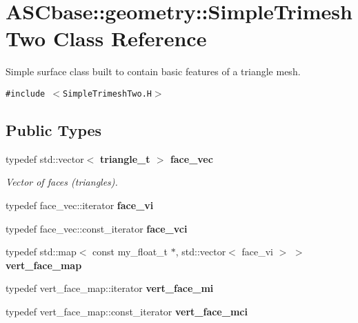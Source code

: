 \section{ASCbase::geometry::Simple\-Trimesh\-Two Class Reference}
\label{classASCbase_1_1geometry_1_1SimpleTrimeshTwo}
Simple surface class built to contain basic features of a triangle mesh.  


{\tt \#include $<$Simple\-Trimesh\-Two.H$>$}

\subsection*{Public Types}
\begin{CompactItemize}
\item 
typedef std::vector$<$ \bf{triangle\_\-t} $>$ \bf{face\_\-vec}\label{classASCbase_1_1geometry_1_1SimpleTrimeshTwo_ec05b95a341017a23bdde9bf620ebd9d}

\begin{CompactList}\small\item\em Vector of faces (triangles). \item\end{CompactList}\item 
typedef face\_\-vec::iterator \textbf{face\_\-vi}\label{classASCbase_1_1geometry_1_1SimpleTrimeshTwo_9f9179ecbefd0b14eb5b29e70bb525fd}

\item 
typedef face\_\-vec::const\_\-iterator \textbf{face\_\-vci}\label{classASCbase_1_1geometry_1_1SimpleTrimeshTwo_c9438f49aea92dbb9ad4f32ba5e032e5}

\item 
typedef std::map$<$ const my\_\-float\_\-t $\ast$, std::vector$<$ face\_\-vi $>$ $>$ \textbf{vert\_\-face\_\-map}\label{classASCbase_1_1geometry_1_1SimpleTrimeshTwo_3af2a848c69967b35e02a7f3a7f5b93e}

\item 
typedef vert\_\-face\_\-map::iterator \textbf{vert\_\-face\_\-mi}\label{classASCbase_1_1geometry_1_1SimpleTrimeshTwo_a582b60e306ca9d1cd1c26c4e93f27a0}

\item 
typedef vert\_\-face\_\-map::const\_\-iterator \textbf{vert\_\-face\_\-mci}\label{classASCbase_1_1geometry_1_1SimpleTrimeshTwo_e129ee7a79ee1a610e15d68f0b04f559}

\end{CompactItemize}
